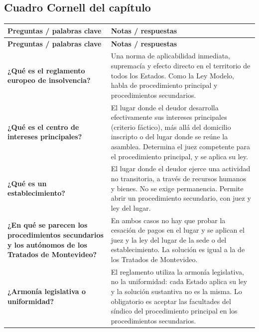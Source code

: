 \documentclass[12pt,oneside]{book}
\begin{document}
\subsection*{Cuadro Cornell del capítulo}

\begin{longtable}{>{\raggedright\arraybackslash}p{} >{\raggedright\arraybackslash}p{}}
\toprule
\textbf{Preguntas / palabras clave} & \textbf{Notas / respuestas} \\
\midrule
\endfirsthead
\toprule
\textbf{Preguntas / palabras clave} & \textbf{Notas / respuestas} \\
\midrule
\endhead
\bottomrule
\endlastfoot

\textbf{¿Qué es el reglamento europeo de insolvencia?} &
Una norma de aplicabilidad inmediata, supremacía y efecto directo en el territorio de todos los Estados. Como la Ley Modelo, habla de procedimiento principal y procedimientos secundarios. \\

\textbf{¿Qué es el centro de intereses principales?} &
El lugar donde el deudor desarrolla efectivamente sus intereses principales (criterio fáctico), más allá del domicilio inscripto o del lugar donde se reúne la asamblea. Determina el juez competente para el procedimiento principal, y se aplica su ley. \\

\textbf{¿Qué es un establecimiento?} &
El lugar donde el deudor ejerce una actividad no transitoria, a través de recursos humanos y bienes. No se exige permanencia. Permite abrir un procedimiento secundario, con juez y ley del lugar. \\

\textbf{¿En qué se parecen los procedimientos secundarios y los autónomos de los Tratados de Montevideo?} &
En ambos casos no hay que probar la cesación de pagos en el lugar y se aplican el juez y la ley del lugar de la sede o del establecimiento. La solución es igual a la de los Tratados de Montevideo. \\

\textbf{¿Armonía legislativa o uniformidad?} &
El reglamento utiliza la armonía legislativa, no la uniformidad: cada Estado aplica su ley y la solución sustantiva no es la misma. Lo obligatorio es aceptar las facultades del síndico del procedimiento principal en los procedimientos secundarios. \\


\end{longtable}
\end{document}
